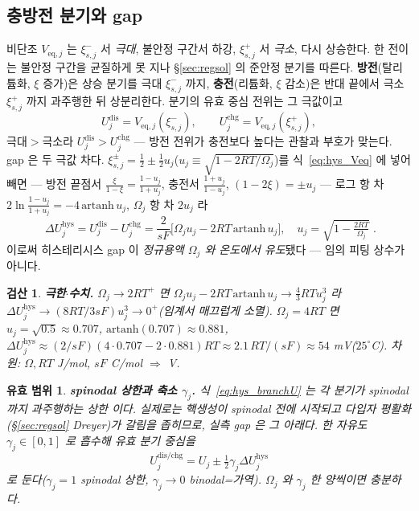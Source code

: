 \documentclass[11pt,a4paper]{article}
\newtheorem*{boundbox}{유효 범위}
\newtheorem*{verifybox}{검산}
\newcommand{\eq}{\mathrm{eq}}
\newcommand{\dis}{\mathrm{dis}}
\newcommand{\chg}{\mathrm{chg}}
\newcommand{\hys}{\mathrm{hys}}
\begin{document}
\subsection{충방전 분기와 gap}
비단조 $V_{\eq,j}$ 는 $\xi_{s,j}^-$ 서 \emph{극대}, 불안정 구간서 하강, $\xi_{s,j}^+$ 서 \emph{극소}, 다시 상승한다.
한 전이는 불안정 구간을 균질하게 못 지나 \S\ref{sec:regsol} 의 준안정 분기를 따른다. \textbf{방전}(탈리튬화, $\xi$
증가)은 상승 분기를 극대 $\xi_{s,j}^-$ 까지, \textbf{충전}(리튬화, $\xi$ 감소)은 반대 끝에서 극소 $\xi_{s,j}^+$ 까지
과주행한 뒤 상분리한다. 분기의 유효 중심 전위는 그 극값이고
\begin{equation}
U_j^\dis=V_{\eq,j}(\xi_{s,j}^-),\qquad U_j^\chg=V_{\eq,j}(\xi_{s,j}^+),
\label{eq:hys_branchU}
\end{equation}
극대$>$극소라 $U_j^\dis>U_j^\chg$ — 방전 전위가 충전보다 높다는 관찰과 부호가 맞는다. gap 은 두 극값 차다.
$\xi_{s,j}^\pm=\tfrac12\pm\tfrac12 u_j$($u_j\equiv\sqrt{1-2RT/\Omega_j}$)를 식~\eqref{eq:hys_Veq} 에 넣어 빼면 —
방전 끝점서 $\tfrac{\xi}{1-\xi}=\tfrac{1-u_j}{1+u_j}$, 충전서 $\tfrac{1+u_j}{1-u_j}$, $(1-2\xi)=\pm u_j$ — 로그 항
차 $2\ln\tfrac{1-u_j}{1+u_j}=-4\,\mathrm{artanh}\,u_j$, $\Omega_j$ 항 차 $2u_j$ 라
\begin{equation}
\boxed{\;\Delta U_j^\hys=U_j^\dis-U_j^\chg=\frac{2}{sF}\big[\Omega_j u_j-2RT\,\mathrm{artanh}\,u_j\big],\quad
u_j=\sqrt{1-\tfrac{2RT}{\Omega_j}}\;.}
\label{eq:hys_dU}
\end{equation}
이로써 히스테리시스 gap 이 \emph{정규용액 $\Omega_j$ 와 온도에서 유도}됐다 — 임의 피팅 상수가 아니다.
\begin{verifybox}
\textbf{극한$\cdot$수치.} $\Omega_j\to2RT^+$ 면 $\Omega_j u_j-2RT\,\mathrm{artanh}\,u_j\to\tfrac43RT u_j^3$ 라
$\Delta U_j^\hys\to(8RT/3sF)u_j^3\to0^+$(임계서 매끄럽게 소멸). $\Omega_j=4RT$ 면 $u_j=\sqrt{0.5}\approx0.707$,
$\mathrm{artanh}(0.707)\approx0.881$, $\Delta U_j^\hys\approx(2/sF)(4{\cdot}0.707-2{\cdot}0.881)RT\approx2.1\,RT/(sF)
\approx54$ mV($25^\circ$C). 차원: $\Omega,RT$ J/mol, $sF$ C/mol $\Rightarrow$ V.
\end{verifybox}
\begin{boundbox}
\textbf{spinodal 상한과 축소 $\gamma_j$.} 식~\eqref{eq:hys_branchU} 는 각 분기가 spinodal 까지 과주행하는 \emph{상한}
이다. 실제로는 핵생성이 spinodal 전에 시작되고 다입자 평활화(\S\ref{sec:regsol} Dreyer)가 갈림을 좁히므로, 실측
gap 은 그 아래다. 한 자유도 $\gamma_j\in[0,1]$ 로 흡수해 \emph{유효 분기 중심}을
\begin{equation}
U_j^{\dis/\chg}=U_j\pm\tfrac12\gamma_j\Delta U_j^\hys
\label{eq:hys_center}
\end{equation}
로 둔다($\gamma_j=1$ spinodal 상한, $\gamma_j\to0$ binodal=가역). $\Omega_j$ 와 $\gamma_j$ 한 양씩이면 충분하다.
\end{boundbox}
\end{document}
